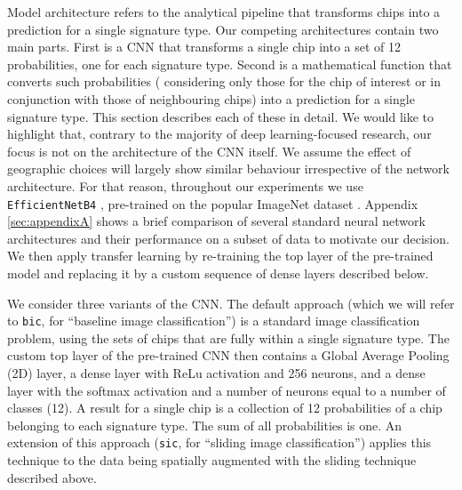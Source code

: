 \documentclass[]{interact}
\theoremstyle{plain}%
\theoremstyle{definition}
\theoremstyle{remark}
\begin{document}
Model architecture refers to the analytical pipeline that transforms chips
into a prediction for a single signature type. Our competing architectures
contain two main parts. First is a CNN that transforms a single chip into a
set of 12 probabilities, one for each signature type.
Second is a mathematical function that converts such probabilities (
considering only those for the chip of interest or in conjunction with
those of neighbouring chips) into a
prediction for a single signature type. This section describes each of these in detail.
We would like to highlight that, contrary to the majority of deep
learning-focused research, our focus is not on the architecture of the CNN
itself. We assume the effect of geographic choices will largely show similar
behaviour irrespective of the network architecture. For that reason, throughout
our experiments we use \texttt{EfficientNetB4} \citep{https://doi.org/10.48550/arxiv.1905.11946}, pre-trained
on the popular ImageNet dataset \citep{deng2009imagenet}. Appendix \ref{sec:appendixA} shows a brief comparison of
several standard neural network architectures and their performance on a subset of data
to motivate our decision. We then apply transfer learning by re-training the
top layer of the pre-trained model and replacing it by a
custom sequence of dense layers described below.

We consider three variants of the CNN.
The default approach (which we will refer to \texttt{bic}, for ``baseline
image classification'') is a standard image classification problem, using the sets of chips
that are fully within a single signature type. The custom top layer of the pre-trained CNN then contains a Global Average
Pooling (2D) layer, a dense layer with ReLu activation and 256 neurons, and a dense
layer with the softmax activation and a number of neurons equal to a number of classes
(12). A result for a single chip is a collection of 12 probabilities
of a chip belonging to each signature type. The sum of all probabilities is
one.
An extension of this approach (\texttt{sic}, for ``sliding image
classification'') applies this technique to the data being spatially augmented
with the sliding technique described above.
\end{document}
